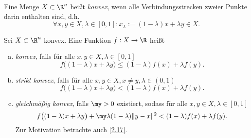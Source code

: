 \begin{df} \label{2.14}
	Eine Menge $X \subset \R^n$ heißt \emph{konvex}, wenn alle Verbindungsstrecken zweier Punkte darin enthalten sind, d.h.
	\[
		\forall x,y \in X, \lambda \in [0,1]:
		x_\lambda
		:= (1-\lambda)x + \lambda y \in X.
	\]
\end{df}

\begin{df} \label{2.15}
	Sei $X \subset \R^n$ konvex.
	Eine Funktion $f: X \to \R$ heißt
	\begin{enumerate}[(a)]
		\item
			\emph{konvex}, falls für alle $x,y \in X, \lambda \in [0,1]$
			\[
				f\big((1-\lambda)x + \lambda y\big)
				\le (1-\lambda) f(x) + \lambda f(y).
			\]
		\item
			\emph{strikt konvex}, falls für alle $x,y \in X, x \neq y, \lambda \in (0,1)$
			\[
				f\big((1-\lambda)x + \lambda y\big)
				< (1-\lambda) f(x) + \lambda f(y).
			\]
		\item
			\emph{gleichmäßig konvex}, falls $\my > 0$ existiert, sodass für alle $x,y \in X, \lambda \in [0,1]$
			\[
				f\big((1-\lambda)x + \lambda y\big) + \my \lambda(1-\lambda) \|y-x\|^2
				< (1-\lambda) f(x) + \lambda f(y).
			\]
			Zur Motivation betrachte auch \ref{2.17}.
	\end{enumerate}
\end{df}

